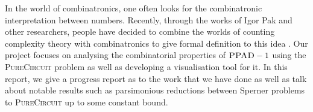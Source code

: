 In the world of combinatronics, one often looks for the combinatronic interpretation between numbers.
Recently, through the works of Igor Pak and other researchers, people have decided
to combine the worlds of counting complexity theory with combinatronics to give formal
definition to this idea \cite{ikenmeyer_WhatWhatNot_2022, ikenmeyer_PositivitySymmetricGroup_2024, pak_WhatCombinatorialInterpretation_2022}. 
Our project focuses on analysing the combinatorial properties of $\textsc{PPAD} -1$ using
the \textsc{PureCircuit} problem as well as developing a visualisation tool for it. In this report, we give a progress report as to the work that 
we have done as well as talk about notable results such as parsimonious reductions between Sperner problems to
\textsc{PureCircuit} up to some constant bound.



